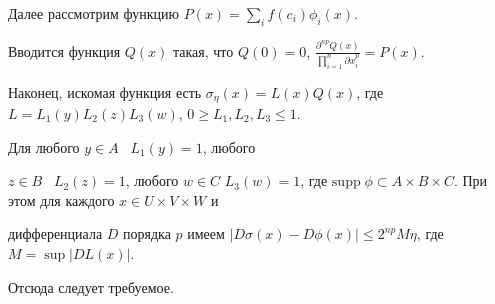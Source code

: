 \begin{pf}
Далее рассмотрим функцию $P(x)=\sum\limits_{i}f(c_i)\phi_i(x)$.


Вводится функция $Q(x)$ такая, что $Q(0)=0$, $\frac{\partial^{n


p}Q(x)}{\prod\limits_{i=1}^{n}\partial x_i^p}=P(x)$.


Наконец, искомая функция есть $\sigma_{\eta}(x)=L(x)Q(x)$, где $L=L_1(y)


L_2(z) L_3(w)$, $0\geq L_1, L_2, L_3 \leq 1$.


Для любого $y \in A$ \ $L_1(y)=1$, любого


$z \in B$ \ $L_2(z)=1$, любого $w \in C$ $L_3(w)=1$, где $\mathrm{supp}\; \phi \subset


A \times B \times C$. При этом для каждого $x \in U \times V \times W$ и


дифференциала $D$ порядка $p$ имеем $|D\sigma(x)-D\phi(x)|\leq 2^{np} M


\eta$, где $M=\sup|DL(x)|$.


Отсюда следует требуемое.


\end{pf}











